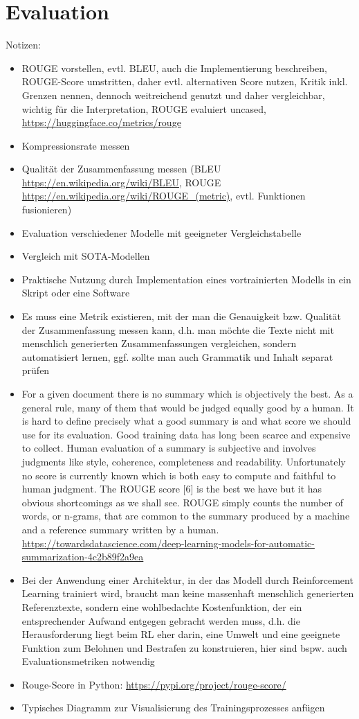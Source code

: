 \section{Evaluation}
Notizen:
\begin{itemize}
	\item ROUGE vorstellen, evtl. BLEU, auch die Implementierung beschreiben, ROUGE-Score umstritten, daher evtl. alternativen Score nutzen, Kritik inkl. Grenzen nennen, dennoch weitreichend genutzt und daher vergleichbar, wichtig für die Interpretation, ROUGE evaluiert uncased, \url{https://huggingface.co/metrics/rouge}
	\item Kompressionsrate messen
	\item Qualität der Zusammenfassung messen (BLEU \url{https://en.wikipedia.org/wiki/BLEU}, ROUGE \url{https://en.wikipedia.org/wiki/ROUGE_(metric)}, evtl. Funktionen fusionieren)
	\item Evaluation verschiedener Modelle mit geeigneter Vergleichstabelle
	\item Vergleich mit SOTA-Modellen
	\item Praktische Nutzung durch Implementation eines vortrainierten Modells in ein Skript oder eine Software
	\item Es muss eine Metrik existieren, mit der man die Genauigkeit bzw. Qualität der Zusammenfassung messen kann, d.h. man möchte die Texte nicht mit menschlich generierten Zusammenfassungen vergleichen, sondern automatisiert lernen, ggf. sollte man auch Grammatik und Inhalt separat prüfen
	\item For a given document there is no summary which is objectively the best. As a general rule, many of them that would be judged equally good by a human. It is hard to define precisely what a good summary is and what score we should use for its evaluation. Good training data has long been scarce and expensive to collect. Human evaluation of a summary is subjective and involves judgments like style, coherence, completeness and readability. Unfortunately no score is currently known which is both easy to compute and faithful to human judgment. The ROUGE score [6] is the best we have but it has obvious shortcomings as we shall see. ROUGE simply counts the number of words, or n-grams, that are common to the summary produced by a machine and a reference summary written by a human. \url{https://towardsdatascience.com/deep-learning-models-for-automatic-summarization-4c2b89f2a9ea}
	\item Bei der Anwendung einer Architektur, in der das Modell durch Reinforcement Learning trainiert wird, braucht man keine massenhaft menschlich generierten Referenztexte, sondern eine wohlbedachte Kostenfunktion, der ein entsprechender Aufwand entgegen gebracht werden muss, d.h. die Herausforderung liegt beim RL eher darin, eine Umwelt und eine geeignete Funktion zum Belohnen und Bestrafen zu konstruieren, hier sind bspw. auch Evaluationsmetriken notwendig
	\item Rouge-Score in Python: \url{https://pypi.org/project/rouge-score/}
	\item Typisches Diagramm zur Visualisierung des Trainingsprozesses anfügen
\end{itemize}
